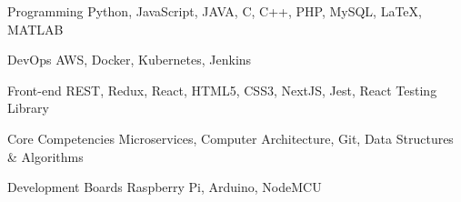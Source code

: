 

\begin{cvskills}

  \cvskill
    {Programming} %
    {Python, JavaScript, JAVA, C, C++, PHP, MySQL, LaTeX, MATLAB} %

  \cvskill
    {DevOps} %
    {AWS, Docker, Kubernetes, Jenkins } %

  \cvskill
    {Front-end} %
    {REST, Redux, React, HTML5, CSS3, NextJS, Jest, React Testing Library} %

  \cvskill
    {Core Competencies} %
    {Microservices, Computer Architecture, Git, Data Structures \& Algorithms} %

  \cvskill
    {Development Boards} %
    {Raspberry Pi, Arduino, NodeMCU}%

\end{cvskills}
